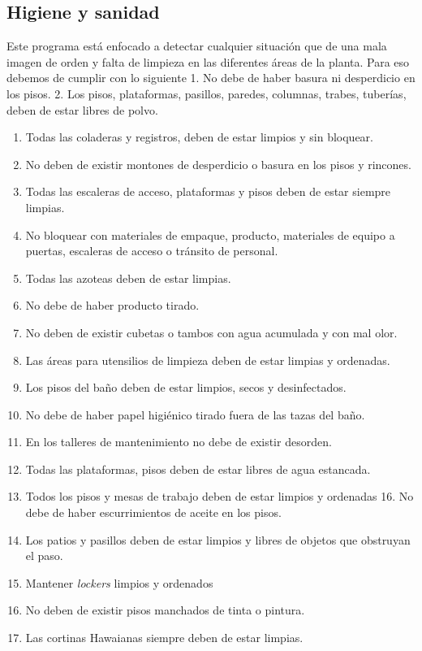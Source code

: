 \subsection{Higiene y sanidad}

Este programa está enfocado a detectar cualquier situación que de una mala imagen de orden y falta de limpieza en las diferentes áreas de la planta. Para eso debemos de cumplir con lo siguiente 1. No debe de haber basura ni desperdicio en los pisos.
2. Los pisos, plataformas, pasillos, paredes, columnas, trabes, tuberías, deben de estar libres de polvo.

\begin{enumerate}
	\item Todas las coladeras y registros, deben de estar limpios y sin bloquear.
	\item No deben de existir montones de desperdicio o basura en los pisos y rincones.
	\item Todas las escaleras de acceso, plataformas y pisos deben de estar siempre limpias.
	\item No bloquear con materiales de empaque, producto, materiales de equipo a puertas, escaleras de acceso o tránsito de personal.
	\item Todas las azoteas deben de estar limpias.
	\item No debe de haber producto tirado.
	\item No deben de existir cubetas o tambos con agua acumulada y con mal olor.
	\item Las áreas para utensilios de limpieza deben de estar limpias y ordenadas.
	\item Los pisos del baño deben de estar limpios, secos y desinfectados.
	\item No debe de haber papel higiénico tirado fuera de las tazas del baño.
	\item En los talleres de mantenimiento no debe de existir desorden.
	\item Todas las plataformas, pisos deben de estar libres de agua estancada.
	\item Todos los pisos y mesas de trabajo deben de estar limpios y ordenadas 16. No debe de haber escurrimientos de aceite en los pisos.
	\item Los patios y pasillos deben de estar limpios y libres de objetos que obstruyan el paso.
	\item Mantener \emph{lockers} limpios y ordenados
	\item No deben de existir pisos manchados de tinta o pintura.
	\item Las cortinas Hawaianas siempre deben de estar limpias.
\end{enumerate}

